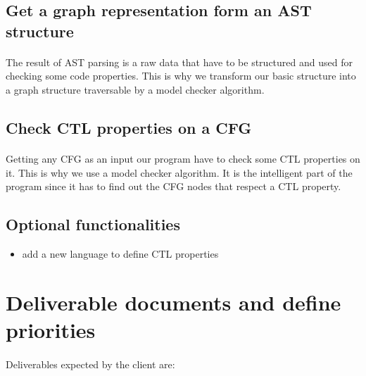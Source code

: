 \documentclass{report}
\begin{document}
\subsection{Get a graph representation form an AST structure}

\paragraph{}
\hspace{4mm}\textnormal{The result of AST parsing is a raw data that have to be structured and used for checking some code properties. This is why we transform our basic structure into a graph structure traversable by a model checker algorithm.}

\subsection{Check CTL properties on a CFG}

\paragraph{}
\hspace{4mm}\textnormal{Getting any CFG as an input our program have to check some CTL properties on it. This is why we use a model checker algorithm. It is the intelligent part of the program since it has to find out the CFG nodes that respect a CTL property.}

\subsection{Optional functionalities}

\vspace{3mm}
\begin{itemize}
\item add a new language to define CTL properties\vspace{1mm}
\end{itemize}

\section{Deliverable documents and define priorities}

\paragraph{}
\hspace{4mm}\textnormal{Deliverables expected by the client are:}
\end{document}
